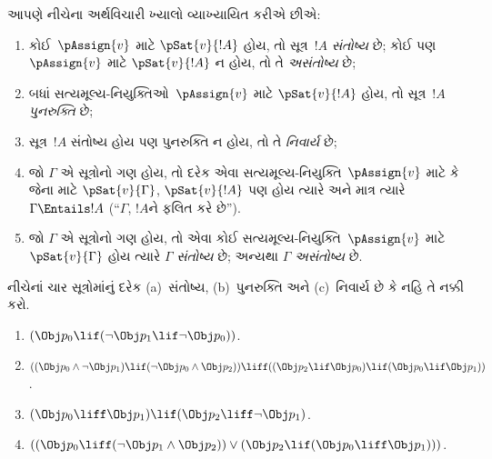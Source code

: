 \begingroup
\makeatletter{}\makeatother


\label{guunit:OLP-0062}


આપણે નીચેના અર્થવિચારી ખ્યાલો વ્યાખ્યાયિત કરીએ છીએ:

\begin{defn}
\begin{enumerate}
\item કોઈ~$\pAssign{v}$ માટે $\pSat{v}{!A}$ હોય, તો
  સૂત્ર~$!A$ \emph{સંતોષ્ય} છે; કોઈ પણ $\pAssign{v}$ માટે
  $\pSat{v}{!A}$ ન હોય, તો તે \emph{અસંતોષ્ય} છે;
\item બધાં સત્યમૂલ્ય-નિયુક્તિઓ~$\pAssign{v}$ માટે $\pSat{v}{!A}$ હોય, તો
  સૂત્ર~$!A$ \emph{પુનરુક્તિ} છે;
\item સૂત્ર~$!A$ સંતોષ્ય હોય પણ પુનરુક્તિ ન હોય, તો તે
  \emph{નિવાર્ય} છે;
\item જો $\Gamma$ એ સૂત્રોનો ગણ હોય, તો દરેક એવા
  સત્યમૂલ્ય-નિયુક્તિ~$\pAssign{v}$ માટે કે જેના માટે $\pSat{v}{\Gamma}$,
  $\pSat{v}{!A}$ પણ હોય ત્યારે અને માત્ર ત્યારે $\Gamma\Entails !A$
  (``$\Gamma$, $!A$ને ફલિત કરે છે'').
\item જો $\Gamma$ એ સૂત્રોનો ગણ હોય, તો એવા કોઈ
  સત્યમૂલ્ય-નિયુક્તિ~$\pAssign{v}$ માટે $\pSat{v}{\Gamma}$ હોય ત્યારે
  $\Gamma$ \emph{સંતોષ્ય} છે; અન્યથા $\Gamma$ \emph{અસંતોષ્ય} છે.
\end{enumerate}
\end{defn}

\begin{prob}
 નીચેનાં ચાર સૂત્રોમાંનું દરેક (a)~સંતોષ્ય, (b)~પુનરુક્તિ અને
 (c)~નિવાર્ય છે કે નહિ તે નક્કી કરો.
\begin{enumerate}
  \item \( ( \Obj p_0 \lif ( \lnot \Obj p_1 \lif \lnot \Obj p_0 ) ) \).
  \item \( ( ( \Obj p_0 \land \lnot \Obj p_1 ) \lif ( \lnot \Obj p_0 \land \Obj p_2 )) \liff ( ( \Obj p_2 \lif \Obj p_0 ) \lif ( \Obj p_0 \lif \Obj p_1 )) \).
  \item \( ( \Obj p_0 \liff \Obj p_1 ) \lif ( \Obj p_2 \liff \lnot \Obj p_1 ) \).
  \item \( (( \Obj p_0 \liff ( \lnot \Obj p_1 \land \Obj p_2 )) \lor ( \Obj p_2 \lif ( \Obj p_0 \liff \Obj p_1 ))) \).
\end{enumerate}
\end{prob}

